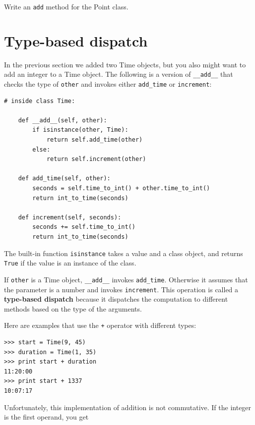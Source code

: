 \documentclass[10pt]{book}
\begin{document}
\begin{ex}
Write an {\tt add} method for the Point class.  
\end{ex}


\section{Type-based dispatch}

In the previous section we added two Time objects, but you
also might want to add an integer to a Time object.  The
following is a version of \verb"__add__"
that checks the type of {\tt other} and invokes either
\verb"add_time" or {\tt increment}:

\beforeverb
\begin{verbatim}
# inside class Time:

    def __add__(self, other):
        if isinstance(other, Time):
            return self.add_time(other)
        else:
            return self.increment(other)

    def add_time(self, other):
        seconds = self.time_to_int() + other.time_to_int()
        return int_to_time(seconds)

    def increment(self, seconds):
        seconds += self.time_to_int()
        return int_to_time(seconds)
\end{verbatim}
\afterverb
%
The built-in function {\tt isinstance} takes a value and a
class object, and returns {\tt True} if the value is an instance
of the class.


If {\tt other} is a Time object, \verb"__add__" invokes
\verb"add_time".  Otherwise it assumes that the parameter
is a number and invokes {\tt increment}.  This operation is
called a {\bf type-based dispatch} because it dispatches the
computation to different methods based on the type of the
arguments.


Here are examples that use the {\tt +} operator with different
types:

\beforeverb
\begin{verbatim}
>>> start = Time(9, 45)
>>> duration = Time(1, 35)
>>> print start + duration
11:20:00
>>> print start + 1337
10:07:17
\end{verbatim}
\afterverb
%
Unfortunately, this implementation of addition is not commutative.
If the integer is the first operand, you get
\end{document}
